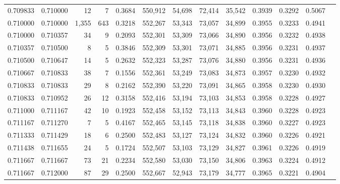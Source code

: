 \begin{tabular}{rrrrrrrrrrrrr}
0.709833 & 0.710000 &    12 &   7 &                                     0.3684 & 550,912 &  54,698 &  72,414 &  35,542 & 0.3939 & 0.3292 & 0.5067 \\
0.710000 & 0.710000 & 1,355 & 643 &                                     0.3218 & 552,267 &  53,343 &  73,057 &  34,899 & 0.3955 & 0.3233 & 0.4941 \\
0.710000 & 0.710357 &    34 &   9 &                                     0.2093 & 552,301 &  53,309 &  73,066 &  34,890 & 0.3956 & 0.3232 & 0.4938 \\
0.710357 & 0.710500 &     8 &   5 &                                     0.3846 & 552,309 &  53,301 &  73,071 &  34,885 & 0.3956 & 0.3231 & 0.4937 \\
0.710500 & 0.710647 &    14 &   5 &                                     0.2632 & 552,323 &  53,287 &  73,076 &  34,880 & 0.3956 & 0.3231 & 0.4936 \\
0.710667 & 0.710833 &    38 &   7 &                                     0.1556 & 552,361 &  53,249 &  73,083 &  34,873 & 0.3957 & 0.3230 & 0.4932 \\
0.710833 & 0.710833 &    29 &   8 &                                     0.2162 & 552,390 &  53,220 &  73,091 &  34,865 & 0.3958 & 0.3230 & 0.4930 \\
0.710833 & 0.710952 &    26 &  12 &                                     0.3158 & 552,416 &  53,194 &  73,103 &  34,853 & 0.3958 & 0.3228 & 0.4927 \\
0.711000 & 0.711167 &    42 &  10 &                                     0.1923 & 552,458 &  53,152 &  73,113 &  34,843 & 0.3960 & 0.3228 & 0.4923 \\
0.711167 & 0.711270 &     7 &   5 &                                     0.4167 & 552,465 &  53,145 &  73,118 &  34,838 & 0.3960 & 0.3227 & 0.4923 \\
0.711333 & 0.711429 &    18 &   6 &                                     0.2500 & 552,483 &  53,127 &  73,124 &  34,832 & 0.3960 & 0.3226 & 0.4921 \\
0.711438 & 0.711655 &    24 &   5 &                                     0.1724 & 552,507 &  53,103 &  73,129 &  34,827 & 0.3961 & 0.3226 & 0.4919 \\
0.711667 & 0.711667 &    73 &  21 &                                     0.2234 & 552,580 &  53,030 &  73,150 &  34,806 & 0.3963 & 0.3224 & 0.4912 \\
0.711667 & 0.712000 &    87 &  29 &                                     0.2500 & 552,667 &  52,943 &  73,179 &  34,777 & 0.3965 & 0.3221 & 0.4904 \\

\end{tabular}
